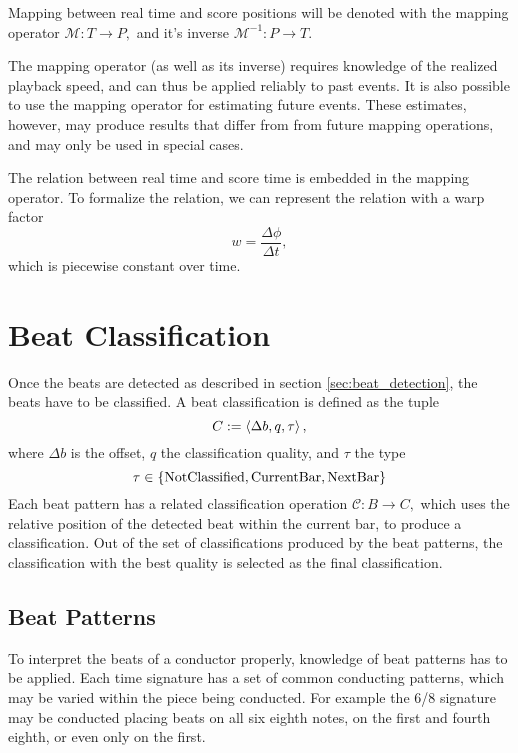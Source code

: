 Mapping between real time and score positions will be denoted with
the mapping operator
$ \mathcal{M} : T \rightarrow P, $
and it's inverse
$ \mathcal{M}^{-1} : P \rightarrow T. $

The mapping operator (as well as its inverse)
requires knowledge of
the realized playback speed,
and can thus be applied reliably to
past events.
It is also possible to use the mapping operator for
estimating future events.
These estimates, however,
may produce results that differ from
from future mapping operations,
and may only be used in special cases.

The relation between real time and score time
is embedded in the mapping operator.
To formalize the relation, we can
represent the relation with a warp factor
\begin{equation}
w = \frac{\Delta \phi}{\Delta t},
\end{equation}
which is piecewise constant over time.

\section{Beat Classification}

Once the beats are detected as described
in section \ref{sec:beat_detection},
the beats have to be classified.
A beat classification is defined as the tuple
\[
C := \left \langle \Delta b, q, \tau \right \rangle ,
\]
where $\Delta b$ is the offset,
$q$ the classification quality,
and $\tau$ the type
\[
\tau \in \left \lbrace \mathrm{NotClassified}, \mathrm{CurrentBar}, \mathrm{NextBar} \right \rbrace 
\]
Each beat pattern has a related
classification operation $ \mathcal{C} : B \rightarrow C, $
which uses the relative position of the detected beat
within the current bar,
to produce a classification.
Out of the set of classifications produced by the beat patterns,
the classification with the best quality is
selected as the final classification.

\subsection{Beat Patterns}

To interpret the beats of a conductor properly,
knowledge of beat patterns has to be applied.
Each time signature has a set of common conducting patterns,
which may be varied within the piece being conducted.
For example the 6/8 signature may be conducted
placing beats on
all six eighth notes,
on the first and fourth eighth,
or even only on the first.

